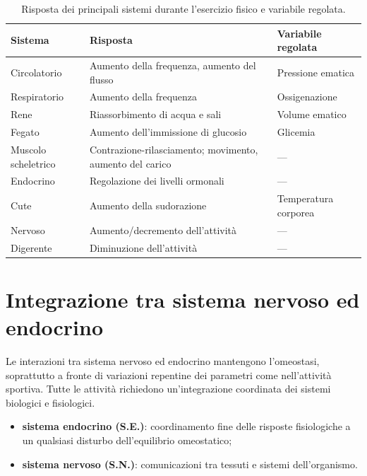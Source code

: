 \begin{table}[htbp]
  \centering
  \small
  \renewcommand{\arraystretch}{1.3}
  \begin{tabularx}{\textwidth}{|l|X|l|}
    \hline
    \textbf{Sistema} & \textbf{Risposta} & \textbf{Variabile regolata} \\
    \hline
    Circolatorio & Aumento della frequenza, aumento del flusso & Pressione ematica \\
    \hline
    Respiratorio & Aumento della frequenza & Ossigenazione \\
    \hline
    Rene & Riassorbimento di acqua e sali & Volume ematico \\
    \hline
    Fegato & Aumento dell'immissione di glucosio & Glicemia \\
    \hline
    Muscolo scheletrico & Contrazione-rilasciamento; movimento, aumento del carico & --- \\
    \hline
    Endocrino & Regolazione dei livelli ormonali & --- \\
    \hline
    Cute & Aumento della sudorazione & Temperatura corporea \\
    \hline
    Nervoso & Aumento/decremento dell'attività & --- \\
    \hline
    Digerente & Diminuzione dell'attività & --- \\
    \hline
  \end{tabularx}
  \caption{Risposta dei principali sistemi durante l'esercizio fisico e variabile regolata.}
  \label{tab:regolazione-esercizio}
\end{table}

\section{Integrazione tra sistema nervoso ed endocrino}

Le interazioni tra sistema nervoso ed endocrino mantengono l'omeostasi, soprattutto a fronte di
variazioni repentine dei parametri come nell'attività sportiva. Tutte le attività richiedono
un'integrazione coordinata dei sistemi biologici e fisiologici.
\begin{itemize}
  \item \textbf{sistema endocrino (S.E.)}: coordinamento fine delle risposte fisiologiche a un
    qualsiasi disturbo dell'equilibrio omeostatico;
  \item \textbf{sistema nervoso (S.N.)}: comunicazioni tra tessuti e sistemi dell'organismo.
\end{itemize}

